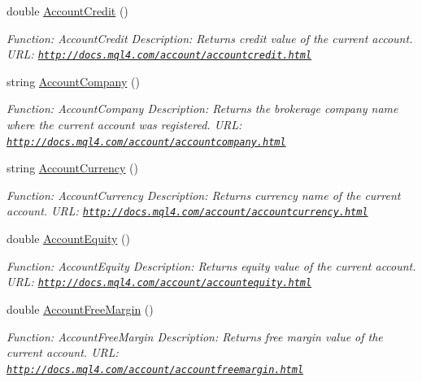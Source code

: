 \begin{DoxyCompactItemize}
double \hyperlink{class_m_q_l4_c_sharp_1_1_base_1_1_m_q_l_base_aabc3bebd8449db982c481116450548f4}{Account\+Credit} ()
\begin{DoxyCompactList}\small\item\em Function\+: Account\+Credit Description\+: Returns credit value of the current account. U\+RL\+: \href{http://docs.mql4.com/account/accountcredit.html}{\tt http\+://docs.\+mql4.\+com/account/accountcredit.\+html} \end{DoxyCompactList}\item 
string \hyperlink{class_m_q_l4_c_sharp_1_1_base_1_1_m_q_l_base_a1c0a4152c86b84249eba3006c981575d}{Account\+Company} ()
\begin{DoxyCompactList}\small\item\em Function\+: Account\+Company Description\+: Returns the brokerage company name where the current account was registered. U\+RL\+: \href{http://docs.mql4.com/account/accountcompany.html}{\tt http\+://docs.\+mql4.\+com/account/accountcompany.\+html} \end{DoxyCompactList}\item 
string \hyperlink{class_m_q_l4_c_sharp_1_1_base_1_1_m_q_l_base_acb86a018d005068a632a4fcfd0a604c8}{Account\+Currency} ()
\begin{DoxyCompactList}\small\item\em Function\+: Account\+Currency Description\+: Returns currency name of the current account. U\+RL\+: \href{http://docs.mql4.com/account/accountcurrency.html}{\tt http\+://docs.\+mql4.\+com/account/accountcurrency.\+html} \end{DoxyCompactList}\item 
double \hyperlink{class_m_q_l4_c_sharp_1_1_base_1_1_m_q_l_base_aeb97f91c13104d72edcdba833460461f}{Account\+Equity} ()
\begin{DoxyCompactList}\small\item\em Function\+: Account\+Equity Description\+: Returns equity value of the current account. U\+RL\+: \href{http://docs.mql4.com/account/accountequity.html}{\tt http\+://docs.\+mql4.\+com/account/accountequity.\+html} \end{DoxyCompactList}\item 
double \hyperlink{class_m_q_l4_c_sharp_1_1_base_1_1_m_q_l_base_aa0080e07fb996d54be406c94512ecfd8}{Account\+Free\+Margin} ()
\begin{DoxyCompactList}\small\item\em Function\+: Account\+Free\+Margin Description\+: Returns free margin value of the current account. U\+RL\+: \href{http://docs.mql4.com/account/accountfreemargin.html}{\tt http\+://docs.\+mql4.\+com/account/accountfreemargin.\+html} \end{DoxyCompactList}\item 

\end{DoxyCompactItemize}
